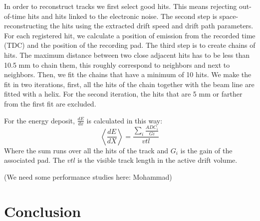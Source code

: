 \documentclass[twocolumn,showpacs,superscriptaddress,groupedaddress]{revtex4}
\begin{document}
In order to reconstruct tracks we first select good hits. This means rejecting 
out-of-time hits and hits linked to the electronic noise. The second step is 
space-reconstructing the hits using the extracted drift speed and drift path 
parameters. For each registered hit, we calculate a position of emission from 
the recorded time (TDC) and the position of the recording pad. The third step 
is to create chains of hits. The maximum distance between two close adjacent 
hits has to be less than 10.5 mm to chain them, this roughly correspond to 
neighbors and next to neighbors. Then, we fit the chains that have a minimum of 
10 hits. We make the fit in two iterations, first, all the hits of the chain 
together with the beam line are fitted with a helix. For the second iteration, 
the hits that are 5 mm or farther from the first fit are excluded.

For the energy deposit, $\frac{dE}{dx}$ is calculated in this way:
\begin{equation}
 \left\langle \frac{dE}{dX} \right\rangle= \frac{\sum\limits_{i} \frac{ADC_{i}}{Gi}}{vtl}
\end{equation}
Where the sum runs over all the hits of the track and $G_{i}$ is the gain of 
the associated pad. The $vtl$ is the visible track length in the active drift 
volume. 

(We need some performance studies here: Mohammad)

\section{Conclusion}




  
\end{document}
